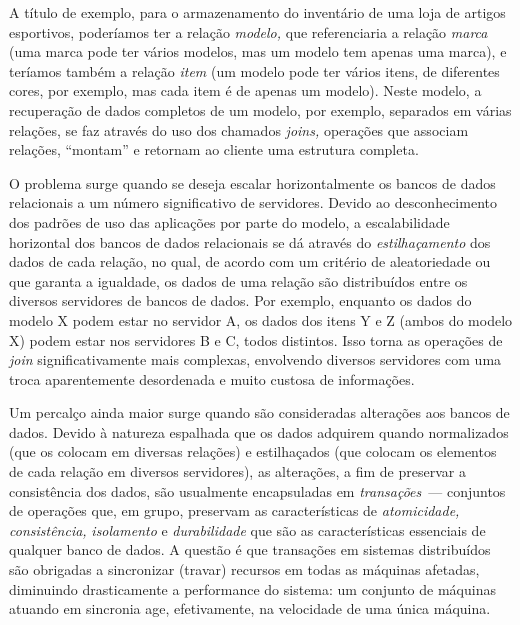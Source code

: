 \documentclass[ruledheader, 12pt]{abnt}
\begin{document}
A título de exemplo, para o armazenamento do inventário de uma loja de artigos esportivos, poderíamos ter a relação \emph{modelo,} que referenciaria a relação \emph{marca} (uma marca pode ter vários modelos, mas um modelo tem apenas uma marca), e teríamos também a relação \emph{item} (um modelo pode ter vários itens, de diferentes cores, por exemplo, mas cada item é de apenas um modelo). Neste modelo, a recuperação de dados completos de um modelo, por exemplo, separados em várias relações, se faz através do uso dos chamados \emph{joins,} operações que associam relações, ``montam'' e retornam ao cliente uma estrutura completa.

O problema surge quando se deseja escalar horizontalmente os bancos de dados relacionais a um número significativo de servidores. Devido ao desconhecimento dos padrões de uso das aplicações por parte do modelo, a escalabilidade horizontal dos bancos de dados relacionais se dá através do \emph{estilhaçamento} dos dados de cada relação, no qual, de acordo com um critério de aleatoriedade ou que garanta a igualdade, os dados de uma relação são distribuídos entre os diversos servidores de bancos de dados. Por exemplo, enquanto os dados do modelo X podem estar no servidor A, os dados dos itens Y e Z (ambos do modelo X) podem estar nos servidores B e C, todos distintos. Isso torna as operações de \emph{join} significativamente mais complexas, envolvendo diversos servidores com uma troca aparentemente desordenada e muito custosa de informações.

Um percalço ainda maior surge quando são consideradas alterações aos bancos de dados. Devido à natureza espalhada que os dados adquirem quando normalizados (que os colocam em diversas relações) e estilhaçados (que colocam os elementos de cada relação em diversos servidores), as alterações, a fim de preservar a consistência dos dados, são usualmente encapsuladas em \emph{transações}~--- conjuntos de operações que, em grupo, preservam as características de \emph{atomicidade,} \emph{consistência,} \emph{isolamento} e \emph{durabilidade} que são as características essenciais de qualquer banco de dados. A questão é que transações em sistemas distribuídos são obrigadas a sincronizar (travar) recursos em todas as máquinas afetadas, diminuindo drasticamente a performance do sistema: um conjunto de máquinas atuando em sincronia age, efetivamente, na velocidade de uma única máquina.
\end{document}

